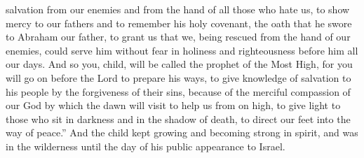 \begin{biblechapter}
\verse salvation from our enemies and from the hand of all those who hate us,
\verse to show mercy to our fathers 
and to remember his holy covenant,
\verse the oath that he swore to Abraham our father, 
to grant us
\verse that we, being rescued from the hand of our enemies, 
could serve him without fear
\verse in holiness and righteousness 
before him all our days.
\verse And so you, child, will be called the prophet of the Most High, 
for you will go on before the Lord to prepare his ways,
\verse to give knowledge of salvation to his people 
by the forgiveness of their sins,
\verse because of the merciful compassion of our God 
by which the dawn will visit to help us from on high,
\verse to give light to those who sit in darkness and in the shadow of death, 
to direct our feet into the way of peace.”
\verse And the child kept growing and becoming strong in spirit, and was in the wilderness until the day of his public appearance to Israel.
\end{biblechapter}

